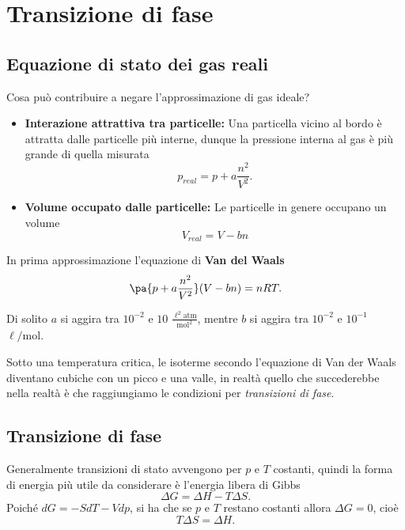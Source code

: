 \chapter{Transizione di fase}


\section{Equazione di stato dei gas reali}
Cosa pu\`o contribuire a negare l'approssimazione di gas ideale?
\begin{itemize}
\item \textbf{Interazione attrattiva tra particelle:} Una particella vicino al bordo \`e attratta dalle particelle pi\`u interne, dunque la pressione interna al gas \`e pi\`u grande di quella misurata 
\[p_{real}=p+a\frac {n^2}{V^2}.\]
\item \textbf{Volume occupato dalle particelle:} Le particelle in genere occupano un volume
\[V_{real}=V-bn\]
\end{itemize}
\begin{fact}
In prima approssimazione l'equazione di \textbf{Van del Waals}
\[\pa{p+a \frac{n^2}{V^2}}(V-bn)=nRT.\]
\end{fact}
\begin{remark}
Di solito $a$ si aggira tra $10^{-2}$ e $10$ $\displaystyle\frac{\ell^2\mathrm{atm}}{\mathrm{mol}^2}$, mentre $b$ si aggira tra $10^{-2}$ e $10^{-1}$ $\ell/\mathrm{mol}$.
\end{remark}

\noindent
Sotto una temperatura critica, le isoterme secondo l'equazione di Van der Waals diventano cubiche con un picco e una valle, in realt\`a quello che succederebbe nella realt\`a \`e che raggiungiamo le condizioni per \textit{transizioni di fase}.

\section{Transizione di fase}
Generalmente transizioni di stato avvengono per $p$ e $T$ costanti, quindi la forma di energia pi\`u utile da considerare \`e l'energia libera di Gibbs
\[\Delta G=\Delta H-T\Delta S.\]
Poich\'e $dG=-SdT-Vdp$, si ha che se $p$ e $T$ restano costanti allora $\Delta G=0$, cio\`e \[T\Delta S=\Delta H.\]
